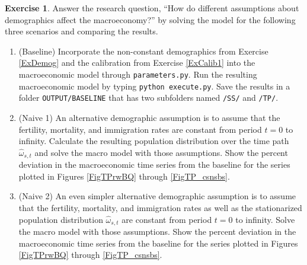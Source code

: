 \documentclass[letterpaper,12pt]{article}
\theoremstyle{definition}
\newtheorem{exercise}[theorem]{Exercise}
\begin{document}
  \begin{exercise}\label{ExExper}
    Answer the research question, ``How do different assumptions about demographics affect the macroeconomy?'' by solving the model for the following three scenarios and comparing the results.
    \begin{enumerate}
      \item (Baseline) Incorporate the non-constant demographics from Exercise \ref{ExDemog} and the calibration from Exercise \ref{ExCalib1} into the macroeconomic model through \texttt{parameters.py}. Run the resulting macroeconomic model by typing \texttt{python execute.py}. Save the results in a folder \texttt{OUTPUT/BASELINE} that has two subfolders named \texttt{/SS/} and \texttt{/TP/}.
      \item (Naive 1) An alternative demographic assumption is to assume that the fertility, mortality, and immigration rates are constant from period $t=0$ to infinity. Calculate the resulting population distribution over the time path $\hat{\omega}_{s,t}$ and solve the macro model with those assumptions. Show the percent deviation in the macroeconomic time series from the baseline for the series plotted in Figures \ref{FigTPrwBQ} through \ref{FigTP_csnsbs}.
      \item (Naive 2) An even simpler alternative demographic assumption is to assume that the fertility, mortality, and immigration rates as well as the stationarized population distribution $\hat{\omega}_{s,t}$ are constant from period $t=0$ to infinity. Solve the macro model with those assumptions. Show the percent deviation in the macroeconomic time series from the baseline for the series plotted in Figures \ref{FigTPrwBQ} through \ref{FigTP_csnsbs}.
    \end{enumerate}
  \end{exercise}

  \renewcommand\theenumi{\roman{enumi}}



\end{document}
